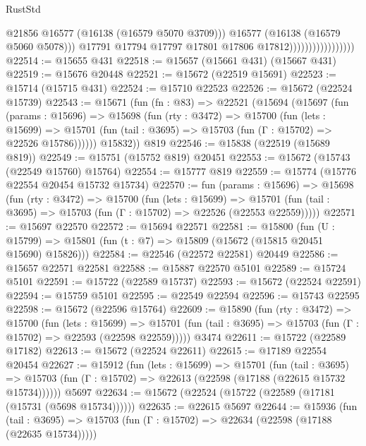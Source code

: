 \begin{lexlean}{RustStd}
\begin{coremodule}
                                          @21856
                                          @16577
                                          (@16138 (@16579 @5070 @3709)))
                                        @16577
                                        (@16138 (@16579 @5060 @5078)))
                                      @17791
                                      @17794
                                      @17797
                                      @17801
                                      @17806
                                      @17812)))))))))))))))))
@22514 := @15655 @431
@22518 := @15657 (@15661 @431) (@15667 @431)
@22519 := @15676 @20448
@22521 := @15672 (@22519 @15691)
@22523 := @15714 (@15715 @431)
@22524 := @15710 @22523
@22526 := @15672 (@22524 @15739)
@22543 := @15671
    (fun (fn : @83) =>
    @22521
      (@15694
        (@15697
          (fun (params : @15696) =>
          @15698
            (fun (rty : @3472) =>
            @15700
              (fun (lets : @15699) =>
              @15701 (fun (tail : @3695) => @15703 (fun (Γ : @15702) => @22526 @15786))))))
        @15832))
    @819
@22546 := @15838 (@22519 (@15689 @819))
@22549 := @15751 (@15752 @819) @20451
@22553 := @15672 (@15743 (@22549 @15760) @15764)
@22554 := @15777 @819
@22559 := @15774 (@15776 @22554 @20454 @15732 @15734)
@22570 := fun (params : @15696) =>
  @15698
    (fun (rty : @3472) =>
    @15700
      (fun (lets : @15699) =>
      @15701 (fun (tail : @3695) => @15703 (fun (Γ : @15702) => @22526 (@22553 @22559)))))
@22571 := @15697 @22570
@22572 := @15694 @22571
@22581 := @15800
    (fun (U : @15799) => @15801 (fun (t : @7) => @15809 (@15672 (@15815 @20451 @15690) @15826)))
@22584 := @22546 (@22572 @22581) @20449
@22586 := @15657 @22571 @22581
@22588 := @15887 @22570 @5101
@22589 := @15724 @5101
@22591 := @15722 (@22589 @15737)
@22593 := @15672 (@22524 @22591)
@22594 := @15759 @5101
@22595 := @22549 @22594
@22596 := @15743 @22595
@22598 := @15672 (@22596 @15764)
@22609 := @15890
    (fun (rty : @3472) =>
    @15700
      (fun (lets : @15699) =>
      @15701 (fun (tail : @3695) => @15703 (fun (Γ : @15702) => @22593 (@22598 @22559)))))
    @3474
@22611 := @15722 (@22589 @17182)
@22613 := @15672 (@22524 @22611)
@22615 := @17189 @22554 @20454
@22627 := @15912
    (fun (lets : @15699) =>
    @15701
      (fun (tail : @3695) =>
      @15703 (fun (Γ : @15702) => @22613 (@22598 (@17188 (@22615 @15732 @15734))))))
    @5697
@22634 := @15672 (@22524 (@15722 (@22589 (@17181 (@15731 (@5698 @15734))))))
@22635 := @22615 @5697
@22644 := @15936
    (fun (tail : @3695) => @15703 (fun (Γ : @15702) => @22634 (@22598 (@17188 (@22635 @15734)))))

\end{coremodule}
\end{lexlean}
